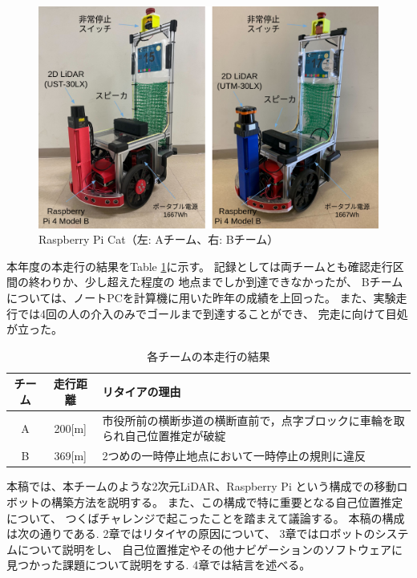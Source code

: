 \documentclass[twocolumn,9pt]{jsproceedings}
\begin{document}
\begin{figure}[h]
 	\begin{center}
 		\includegraphics[width=1.0\linewidth]{figs/raspicat.pdf}
 		\caption{Raspberry Pi Cat（左: Aチーム、右: Bチーム）}
 		\label{fig:raspicat}
 	\end{center}
\end{figure}

本年度の本走行の結果をTable \ref{MainRun}に示す。
記録としては両チームとも確認走行区間の終わりか、少し超えた程度の
地点までしか到達できなかったが、
Bチームについては、ノートPCを計算機に用いた昨年の成績を上回った。
また、実験走行では4回の人の介入のみでゴールまで到達することができ、
完走に向けて目処が立った。

\begin{table}[h]
  \caption{各チームの本走行の結果}
  \label{MainRun}
	\begin{tabular}{|c|c|p{5.4cm}|}
    \hline
	チーム & 走行距離 & リタイアの理由 \\
    \hline
	A & 200[m] & 市役所前の横断歩道の横断直前で，点字ブロックに車輪を取られ自己位置推定が破綻\\
    \hline
	B & 369[m] & 2つめの一時停止地点において一時停止の規則に違反 \\ 
    \hline
  \end{tabular}
\end{table}


本稿では、本チームのような2次元LiDAR、Raspberry Pi
という構成での移動ロボットの構築方法を説明する。
また、この構成で特に重要となる自己位置推定について、
つくばチャレンジで起こったことを踏まえて議論する。
本稿の構成は次の通りである. 
2章ではリタイヤの原因について、
3章ではロボットのシステムについて説明をし、
自己位置推定やその他ナビゲーションのソフトウェアに
見つかった課題について説明をする. 
4章では結言を述べる。
\end{document}
